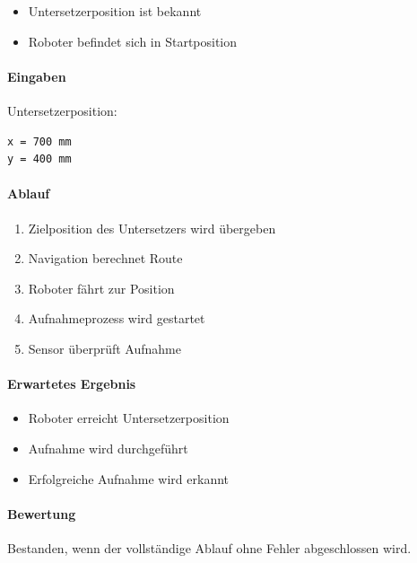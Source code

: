 \documentclass[
  a4paper,
  12pt,
  DIV=12,        %
  parskip=half,  %
  headings=small %
]{scrartcl}
\theoremstyle{definition}
\providecommand{\tightlist}{%
  \setlength{\itemsep}{0pt}\setlength{\parskip}{0pt}}
\theoremstyle{definition}
\begin{document}
\begin{itemize}
\tightlist
\item
  Untersetzerposition ist bekannt
\item
  Roboter befindet sich in Startposition
\end{itemize}

\paragraph{Eingaben}\label{eingaben-13}

Untersetzerposition:

\begin{verbatim}
x = 700 mm
y = 400 mm
\end{verbatim}

\paragraph{Ablauf}\label{ablauf-13}

\begin{enumerate}
\def\labelenumi{\arabic{enumi}.}
\tightlist
\item
  Zielposition des Untersetzers wird übergeben
\item
  Navigation berechnet Route
\item
  Roboter fährt zur Position
\item
  Aufnahmeprozess wird gestartet
\item
  Sensor überprüft Aufnahme
\end{enumerate}

\paragraph{Erwartetes Ergebnis}\label{erwartetes-ergebnis-13}

\begin{itemize}
\tightlist
\item
  Roboter erreicht Untersetzerposition
\item
  Aufnahme wird durchgeführt
\item
  Erfolgreiche Aufnahme wird erkannt
\end{itemize}

\paragraph{Bewertung}\label{bewertung-13}

Bestanden, wenn der vollständige Ablauf ohne Fehler abgeschlossen wird.
\end{document}
